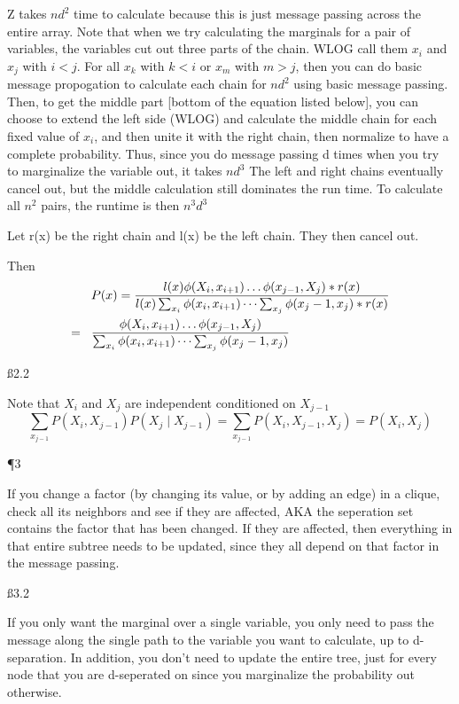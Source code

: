 Z takes $nd^2$ time to calculate because this is just message passing across the entire array. Note that when we try calculating the marginals for a pair of variables, the variables cut out three parts of the chain. WLOG call them $x_i$ and $x_j$ with $i<j$. For all $x_k$ with $k<i$ or $x_m$ with $m>j$, then you can do basic message propogation to calculate each chain for $nd^2$ using basic message passing. Then, to get the middle part [bottom of the equation listed below], you can choose to extend the left side (WLOG) and calculate the middle chain for each fixed value of $x_i$, and then unite it with the right chain, then normalize to have a complete probability. Thus, since you do message passing d times when you try to marginalize the variable out, it takes $nd^3$ The left and right chains eventually cancel out, but the middle calculation still dominates the run time. To calculate all $n^2$ pairs, the runtime is then $n^3d^3$

Let r(x) be the right chain and l(x) be the left chain. They then cancel out.

Then \begin{align*}
& P(x) = \frac{l(x) \phi(X_i,x_{i+1}) \dots\phi(x_{j-1},X_j)*r(x)}{l(x) \sum_{x_i}\phi(x_i,x_{i+1}) \dots \sum_{x_j}\phi(x_j-1,x_{j})*r(x)} \\ = \hspace{3 mm} &
\frac{\phi(X_i,x_{i+1}) \dots\phi(x_{j-1},X_j)}{ \sum_{x_i}\phi(x_i,x_{i+1}) \dots \sum_{x_j}\phi(x_j-1,x_{j})}
\end{align*}


\ss{2.2}

Note that $X_i$ and $X_j$ are independent conditioned on $X_{j-1}$
\[\sum_{x_{j-1}} P(X_i,X_{j-1})P(X_j \mid X_{j-1}) = \sum_{x_{j-1}} P(X_i,X_{j-1},X_j) = P(X_i,X_j) 
\]


\P 3

If you change a factor (by changing its value, or by adding an edge) in a clique, check all its neighbors and see if they are affected, AKA the seperation set contains the factor that has been changed. If they are affected, then everything in that entire subtree needs to be updated, since they all depend on that factor in the message passing.

\ss{3.2}

If you only want the marginal over a single variable, you only need to pass the message along the single path to the variable you want to calculate, up to d-separation. In addition, you don't need to update the entire tree, just for every node that you are d-seperated on since you marginalize the probability out otherwise.

